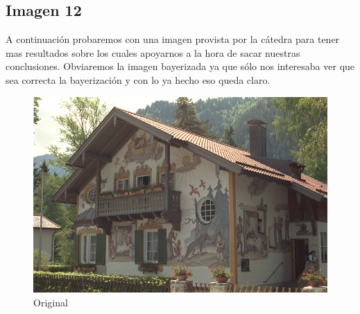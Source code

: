 {\newpage

\subsection{Imagen 12}

A continuación probaremos con una imagen provista por la cátedra para tener mas resultados sobre los cuales apoyarnos a la hora de sacar nuestras conclusiones. Obviaremos la imagen bayerizada ya que sólo
nos interesaba ver que sea correcta la bayerización y con lo ya hecho eso queda claro.
\newpage
\begin{figure}
\begin{center}
       \includegraphics[scale=0.3]{imagenes/img12.png}
       \caption{Original }\label{fig:awesome_image1}
        \end{center}

\end{figure}

}
